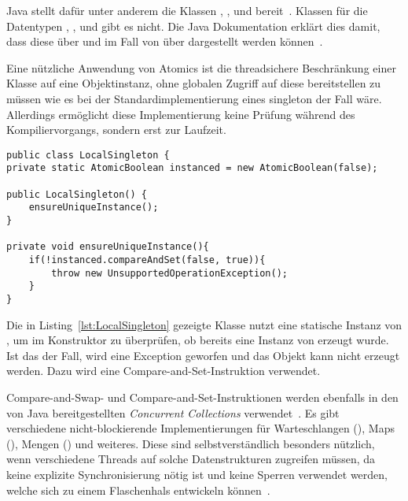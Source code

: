 Java stellt dafür unter anderem die Klassen , ,  und 
bereit~\cite[S.~131]{Friesen2015}. Klassen für die Datentypen , ,  und  gibt es nicht. Die Java Dokumentation erklärt dies damit, dass diese über  und im Fall von  über  dargestellt werden können~\cite{Java7DocAtomic}.

Eine nützliche Anwendung von Atomics ist die threadsichere Beschränkung einer Klasse auf eine Objektinstanz, ohne globalen Zugriff auf diese bereitstellen zu müssen wie es bei der Standardimplementierung eines \gls{singleton} der Fall wäre. Allerdings ermöglicht diese Implementierung keine Prüfung während des Kompiliervorgangs, sondern erst zur Laufzeit.
\begin{lstlisting}[caption={Implementierung einer Klasse, die nur einmal instanziiert werden kann.}, label={lst:LocalSingleton},float]
public class LocalSingleton {
private static AtomicBoolean instanced = new AtomicBoolean(false);

public LocalSingleton() {
	ensureUniqueInstance();
}

private void ensureUniqueInstance(){
	if(!instanced.compareAndSet(false, true)){
		throw new UnsupportedOperationException();
	}
}
\end{lstlisting}
Die in Listing~\ref{lst:LocalSingleton} gezeigte Klasse  nutzt eine statische Instanz von , um im Konstruktor zu überprüfen, ob bereits eine Instanz von  erzeugt wurde. Ist das der Fall, wird eine Exception geworfen und das Objekt kann nicht erzeugt werden. Dazu wird eine Compare-and-Set-Instruktion verwendet.

Compare-and-Swap- und  Compare-and-Set-Instruktionen werden ebenfalls in den von Java bereitgestellten \emph{Concurrent Collections} verwendet~\cite[S. 133~f.]{Friesen2015}. Es gibt verschiedene nicht-blockierende Implementierungen für Warteschlangen (), Maps (), Mengen () und weiteres. Diese sind selbstverständlich besonders nützlich, wenn verschiedene Threads auf solche Datenstrukturen zugreifen müssen, da keine explizite Synchronisierung nötig ist und keine Sperren verwendet werden, welche sich zu einem Flaschenhals entwickeln können~\cite[S.~125~ff.]{Friesen2015}.

